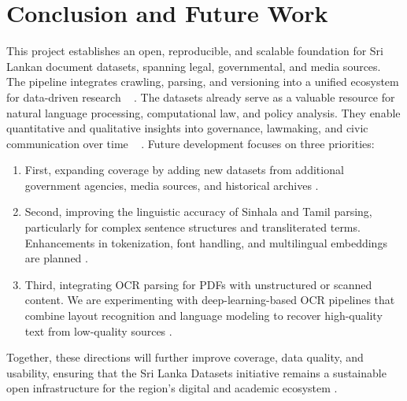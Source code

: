 \documentclass[10pt,a4paper]{article}%
\begin{document}
\section{Conclusion and Future Work}%
\label{sec:ConclusionandFutureWork}%
This project establishes an open, reproducible, and scalable foundation for Sri Lankan document datasets, spanning legal, governmental, and media sources. The pipeline integrates crawling, parsing, and versioning into a unified ecosystem for data-driven research%
~%
\citep{OpenDataPractices2020}%
.%
The datasets already serve as a valuable resource for natural language processing, computational law, and policy analysis. They enable quantitative and qualitative insights into governance, lawmaking, and civic communication over time%
~%
\citep{FAIRPrinciples2016}%
.%
Future development focuses on three priorities:%
\begin{enumerate}%
\item First, expanding coverage by adding new datasets from additional government agencies, media sources, and historical archives .%
\item Second, improving the linguistic accuracy of Sinhala and Tamil parsing, particularly for complex sentence structures and transliterated terms. Enhancements in tokenization, font handling, and multilingual embeddings are planned .%
\item Third, integrating OCR parsing for PDFs with unstructured or scanned content. We are experimenting with deep-learning-based OCR pipelines that combine layout recognition and language modeling to recover high-quality text from low-quality sources .%
\end{enumerate}%
Together, these directions will further improve coverage, data quality, and usability, ensuring that the Sri Lanka Datasets initiative remains a sustainable open infrastructure for the region’s digital and academic ecosystem .

%
%
%
\end{document}
